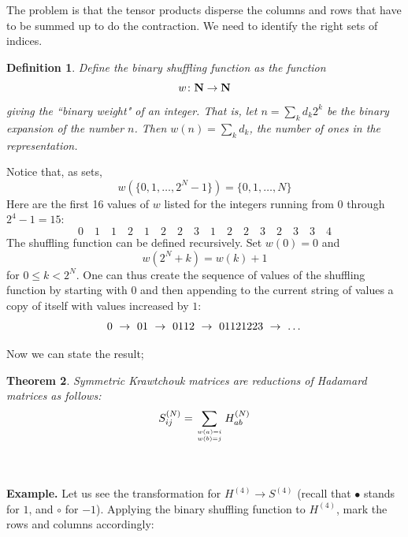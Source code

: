 \documentclass[12pt]{article}
\newtheorem{theorem}{Theorem}[section]       %
\newtheorem{definition}[theorem]{Definition}
\numberwithin{equation}{section}
\begin{document}
The problem is that the tensor products disperse
the columns and rows that have to be 
summed up to do the contraction. 
We need to identify the right sets of indices.
\\
\begin{definition}\rm
Define the {\sl binary shuffling function} 
as the function
$$
         w\colon {\bf N} \to {\bf N}
$$
giving the ``binary weight" of an integer.
That is, let $n=\sum_k d_k 2^k$ be the binary expansion of the
number $n$. Then $w(n)=\sum_k d_k$, 
the number of ones in the representation. 
\end{definition}
Notice that, as sets,
$$       
       w(\{0,1,\ldots, 2^N-1\}) =    \{0, 1,\ldots, N\} 
$$
Here are the first 16 values of $w$ listed for the 
integers running from 0 through $2^4-1=15$:
$$
0 \quad 1 \quad 1 \quad 2 \quad 1 \quad 2 \quad 2 \quad 3 \quad
1 \quad 2 \quad 2 \quad 3 \quad 2 \quad 3 \quad 3 \quad 4 
$$
The shuffling function can be defined recursively. Set 
\hfill\break $w(0)=0$ and
\begin{equation}\label{eq:dynamic}
  w(2^N + k) = w(k)+1 
\end{equation}
for $0\leq k < 2^N$.
One can thus create the sequence of values of the shuffling function 
by starting with $0$ and then appending to the current string
of values a copy of itself with values increased by $1$:
\begin{displaymath}
0
\ \rightarrow\
01
\ \rightarrow\
0112
\ \rightarrow\
01121223
\ \rightarrow\ 
\hbox{\ldots} 
\end{displaymath}



Now we can state the result;

\begin{theorem}
Symmetric Krawtchouk matrices are reductions of Hadamard matrices
as follows:
$$
S^{(N)}_{ij} = \sum_{w(a)=i \atop w(b)=j} H^{(N)}_{ab}
$$
\end{theorem}
~
\\
\\
\noindent
{\bf Example. }
Let us see the transformation for $H^{(4)} \to S^{(4)}$
(recall that $\bullet$ stands for $1$, and $\circ$ for $-1$).
Applying the binary 
shuffling function to $H^{(4)}$, mark the rows and columns 
accordingly:
\end{document}
